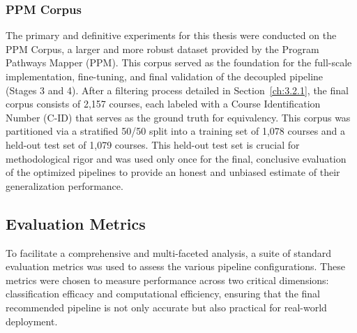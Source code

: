 \subsubsection{PPM Corpus}
The primary and definitive experiments for this thesis were conducted on the PPM Corpus, a larger and more robust dataset provided by the Program Pathways Mapper (PPM). This corpus served as the foundation for the full-scale implementation, fine-tuning, and final validation of the decoupled pipeline (Stages 3 and 4). After a filtering process detailed in Section~\ref{ch:3.2.1}, the final corpus consists of 2,157 courses, each labeled with a Course Identification Number (C-ID) that serves as the ground truth for equivalency. This corpus was partitioned via a stratified 50/50 split into a training set of 1,078 courses and a held-out test set of 1,079 courses. This held-out test set is crucial for methodological rigor and was used only once for the final, conclusive evaluation of the optimized pipelines to provide an honest and unbiased estimate of their generalization performance.

\subsection{Evaluation Metrics}
To facilitate a comprehensive and multi-faceted analysis, a suite of standard evaluation metrics was used to assess the various pipeline configurations. These metrics were chosen to measure performance across two critical dimensions: classification efficacy and computational efficiency, ensuring that the final recommended pipeline is not only accurate but also practical for real-world deployment.

